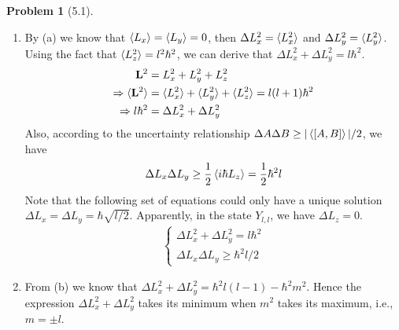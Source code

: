 \documentclass[twoside,11pt]{article}
\theoremstyle{definition}
\newtheorem{problem}{Problem}
\theoremstyle{remark}
\begin{document}
\begin{problem}[5.1]
\begin{enumerate}[label=(\alph*)]
    \item By (a) we know that $\braket{L_x} = \braket{L_y}=0$, then $\Delta L_x^2 = \braket{L_x^2}$ 
    and $\Delta L_y^2 = \braket{L_y^2}$.
    Using the fact that $\braket{L_z^2} = l^2\hbar^2$, we can derive that
    $\Delta L_x^2 + \Delta L_y^2=l\hbar^2$.
    \begin{align*}
        \mathbf{L}^2 &= L_x^2 + L_y^2 + L_z^2\\
        \Rightarrow
        \braket{\mathbf{L}^2} &= \braket{L_x^2} + \braket{L_y^2} + \braket{L_z^2} = l(l+1)\hbar^2  \\
        \Rightarrow l\hbar^2 &= \Delta L_x^2 + \Delta L_y^2
    \end{align*}
    Also, according to the uncertainty relationship $\Delta A\Delta B\geq |\braket{[A,B]}|/2$, we have
    \begin{align*}
        \Delta L_x\Delta L_y \geq \frac{1}{2} \braket{i\hbar L_z} = \frac{1}{2}\hbar^2l
    \end{align*}
    Note that the following set of equations could only have a unique solution
    $\Delta L_x=\Delta L_y=\hbar\sqrt{l/2}$.
    Apparently, in the state $Y_{l,l}$, we have $\Delta L_z = 0$.
    \begin{align*}
        \begin{cases}
            \Delta L_x^2 + \Delta L_y^2 = l\hbar^2\\
            \Delta L_x\Delta L_y \geq \hbar^2 l/2
        \end{cases}
    \end{align*}

    \item From (b) we know that $\Delta L_x^2 + \Delta L_y^2 = \hbar^2l(l-1) - \hbar^2m^2$.
    Hence the expression $\Delta L_x^2 + \Delta L_y^2$ takes its minimum when $m^2$ takes
    its maximum, i.e., $m=\pm l$.


\end{enumerate}
\end{problem}
\end{document}
